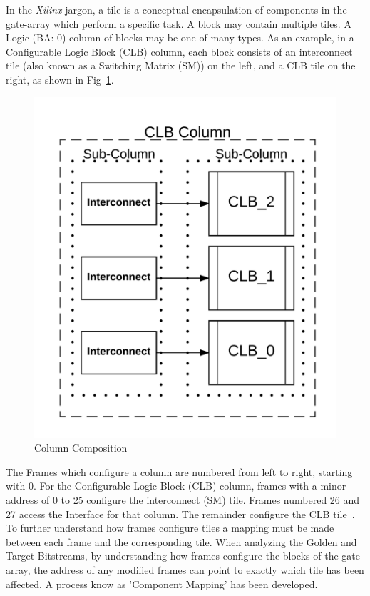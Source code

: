 \documentclass[journal, hidelinks]{IEEEtran}
\begin{document}
In the \textit{Xilinx} jargon, a tile is a conceptual encapsulation of components in the gate-array which perform a specific task.
A block may contain multiple tiles.
A Logic (BA: 0) column of blocks may be one of many types.
As an example, in a Configurable Logic Block (CLB) column, each block consists of an interconnect tile (also known as a Switching Matrix (SM)) on the left, and a CLB tile on the right, as shown in Fig~\ref{fig:column}.
\begin{figure}[h]
	\centering
	\includegraphics[width=0.8\linewidth]{Figures/column}
	\caption[Column Composition]{Column Composition}
	\label{fig:column}
\end{figure}

The Frames which configure a column are numbered from left to right, starting with 0.  
For the Configurable Logic Block (CLB) column, frames with a minor address of 0 to 25 configure the interconnect (SM) tile.
Frames numbered 26 and 27 access the Interface for that column. 
The remainder configure the CLB tile~\cite{virtex5ConfigGuide}.
To further understand how frames configure tiles a mapping must be made between each frame and the corresponding tile.
When analyzing the Golden and Target Bitstreams, by understanding how frames configure the blocks of the gate-array, the address of any modified frames can point to exactly which tile has been affected.
A process know as 'Component Mapping' has been developed. 

\end{document}
